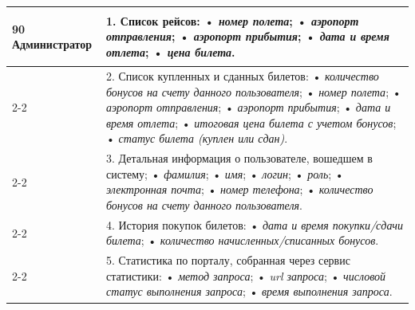\begin{longtable}{|p{0.5cm}|p{15.5cm}|}
  \hline
	\begin{rotatebox}[origin=r]{90}
		{\textbf{Администратор}}
	\end{rotatebox}
	&
	1. Список рейсов: \newline
    • \textit{номер полета}; \newline
    • \textit{аэропорт отправления}; \newline
    • \textit{аэропорт прибытия}; \newline
    • \textit{дата и время отлета}; \newline
    • \textit{цена билета}. \\
	\cline{2-2}
    &
  2. Список купленных и сданных билетов: \newline
    • \textit{количество бонусов на счету данного пользователя}; \newline
    • \textit{номер полета}; \newline
    • \textit{аэропорт отправления}; \newline
    • \textit{аэропорт прибытия}; \newline
    • \textit{дата и время отлета}; \newline
    • \textit{итоговая цена билета с учетом бонусов}; \newline
    • \textit{статус билета (куплен или сдан)}. \\
	\cline{2-2}
    &
  3. Детальная информация о пользователе, вошедшем в систему; \newline
    • \textit{фамилия}; \newline
    • \textit{имя}; \newline
    • \textit{логин}; \newline
    • \textit{роль}; \newline
    • \textit{электронная почта}; \newline
    • \textit{номер телефона}; \newline
    • \textit{количество бонусов на счету данного пользователя}.\\
	\cline{2-2}
	&
	4. История покупок билетов: \newline
    • \textit{дата и время покупки/сдачи билета}; \newline
    • \textit{количество начисленных/списанных бонусов}. \\
	\cline{2-2}
  &
  5. Статистика по порталу, собранная через сервис статистики: \newline
    • \textit{метод запроса}; \newline
    • \textit{url запроса}; \newline
    • \textit{числовой статус выполнения запроса}; \newline
    • \textit{время выполнения запроса}. \\
	\hline
\end{longtable}


